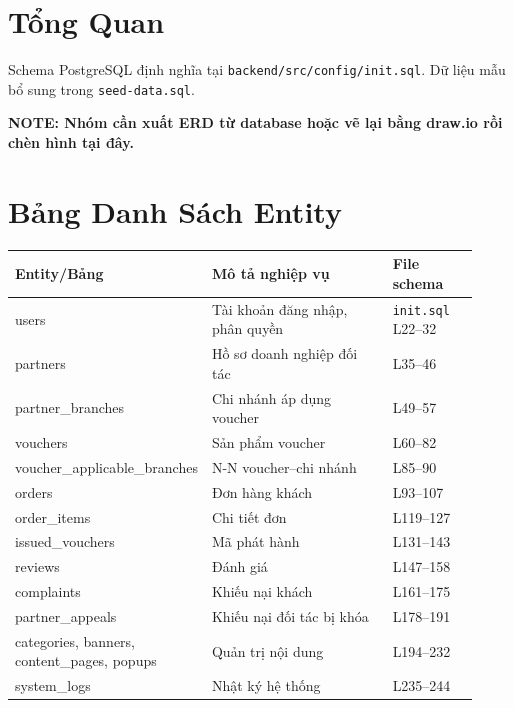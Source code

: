 \section{Tổng Quan}
Schema PostgreSQL định nghĩa tại \texttt{backend/src/config/init.sql}. Dữ liệu mẫu bổ sung trong \texttt{seed-data.sql}.

\textbf{NOTE: Nhóm cần xuất ERD từ database hoặc vẽ lại bằng draw.io rồi chèn hình tại đây.}

\section{Bảng Danh Sách Entity}
\small
\begin{longtable}{>{\raggedright\arraybackslash}p{0.22\linewidth}>{\raggedright\arraybackslash}p{0.50\linewidth}>{\raggedright\arraybackslash}p{0.20\linewidth}}
\toprule
\textbf{Entity/Bảng} & \textbf{Mô tả nghiệp vụ} & \textbf{File schema}\\
\midrule
\endhead
users & Tài khoản đăng nhập, phân quyền & \texttt{init.sql} L22--32\\
partners & Hồ sơ doanh nghiệp đối tác & L35--46\\
partner\_branches & Chi nhánh áp dụng voucher & L49--57\\
vouchers & Sản phẩm voucher & L60--82\\
voucher\_applicable\_branches & N-N voucher--chi nhánh & L85--90\\
orders & Đơn hàng khách & L93--107\\
order\_items & Chi tiết đơn & L119--127\\
issued\_vouchers & Mã phát hành & L131--143\\
reviews & Đánh giá & L147--158\\
complaints & Khiếu nại khách & L161--175\\
partner\_appeals & Khiếu nại đối tác bị khóa & L178--191\\
categories, banners, content\_pages, popups & Quản trị nội dung & L194--232\\
system\_logs & Nhật ký hệ thống & L235--244\\
\bottomrule
\end{longtable}
\normalsize

